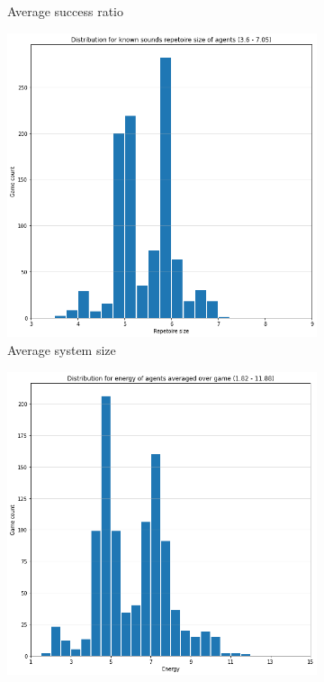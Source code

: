 \begin{figure}[ht]
\begin{subfigure}{.30\textwidth}
        \captionsetup{width=0.9\linewidth}
        \captionsetup{justification=centering}
        \caption{Average success ratio}
    \end{subfigure}
    \hspace{0.5cm}
    \begin{subfigure}{.30\textwidth}
        \centering
        \includegraphics[width=\textwidth]{images/results/bark_size.png}
        \captionsetup{width=0.9\linewidth}
        \captionsetup{justification=centering}
        \caption{Average system size}
    \end{subfigure}
    \hspace{0.5cm}
    \begin{subfigure}{.30\textwidth}
        \centering
        \includegraphics[width=\textwidth]{images/results/bark_energy.png}

\end{subfigure}
\end{figure}
